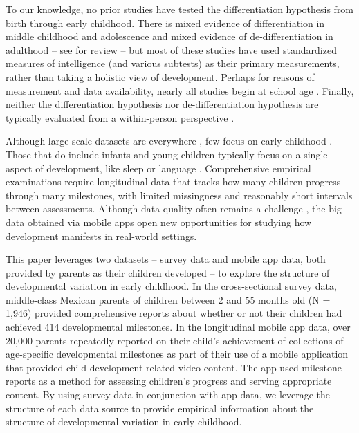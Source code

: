 \documentclass[man, floatsintext]{apa7}
\begin{document}
To our knowledge, no prior studies have tested the differentiation hypothesis from birth through early childhood. There is mixed evidence of differentiation in middle childhood and adolescence \parencite[e.g.,][]{juan-espinosa2006,shing2010,breit2020}
and mixed evidence of de-differentiation in adulthood \parencite[e.g.,][]{hartung2018,li2004} -- see \cite{breit2021} for review -- but most of these studies have used standardized measures of intelligence (and various subtests) as their primary measurements, rather than taking a holistic view of development. Perhaps for reasons of measurement and data availability, nearly all studies begin at school age \parencite[see][table 2]{breit2021}. Finally, neither the differentiation hypothesis nor de-differentiation hypothesis are typically evaluated from a  within-person perspective \parencite[see][as an exception]{hulur2015}. 

Although large-scale datasets are everywhere \parencite{tsai2015}, few
focus on early childhood \parencite[cf.][]{mindell2016,milne-ives2020}.  Those that do include infants and young children typically focus on a single aspect of development, like sleep \parencite{mindell2016} or language \parencite{frank2021}. Comprehensive empirical
examinations require longitudinal data that tracks how many children
progress through many milestones, with limited missingness and
reasonably short intervals between assessments. Although data quality often remains a
challenge \parencite{milne-ives2020}, the big-data obtained
via mobile apps open new opportunities for studying how development
manifests in real-world settings. 

This paper leverages two datasets -- survey data and mobile app data, both provided by parents as their children developed -- to explore
the structure of developmental variation in early childhood. In the
cross-sectional survey data, middle-class Mexican parents of children
between 2 and 55 months old (N = 1,946) provided comprehensive reports
about whether or not their children had achieved 414 developmental
milestones. In the longitudinal mobile app data, over 20,000 parents
repeatedly reported on their child's achievement of collections of
age-specific developmental milestones as part of their use of a mobile
application that provided child development related video content. The
app used milestone reports as a method for assessing children's progress
and serving appropriate content. By using survey data in conjunction
with app data, we leverage the structure of each data source to provide
empirical information about the structure of developmental variation
in early childhood.
\end{document}
